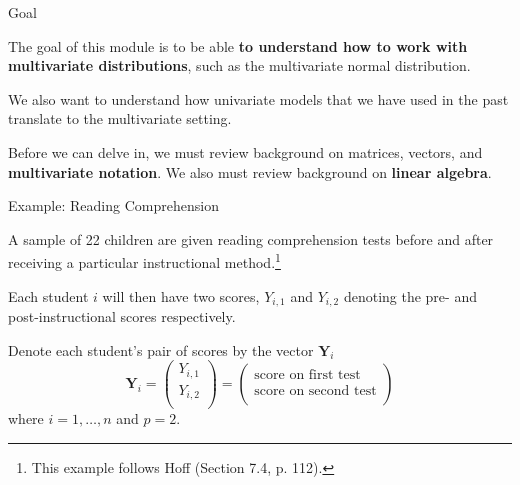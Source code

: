 \documentclass[
  ignorenonframetext,
]{beamer}
\begin{document}
\begin{frame}{Goal}
\protect\hypertarget{goal}{}

The goal of this module is to be able \textbf{to understand how to work
with multivariate distributions}, such as the multivariate normal
distribution.

We also want to understand how univariate models that we have used in
the past translate to the multivariate setting.

Before we can delve in, we must review background on matrices, vectors,
and \textbf{multivariate notation}. We also must review background on
\textbf{linear algebra}.

\end{frame}

\begin{frame}{Example: Reading Comprehension}
\protect\hypertarget{example-reading-comprehension}{}

A sample of 22 children are given reading comprehension tests before and
after receiving a particular instructional
method.\footnote{This example follows Hoff (Section 7.4, p. 112).}

Each student \(i\) will then have two scores, \(Y_{i,1}\) and
\(Y_{i,2}\) denoting the pre- and post-instructional scores
respectively.

Denote each student's pair of scores by the vector \(\bm{Y}_i\) \[
\bm{Y}_{i} = \left( \begin{array}{c}
Y_{i,1}\\
Y_{i,2}\\
\end{array} \right) 
= \left( \begin{array}{c}
\text{score on first test}\\
\text{score on second test}\\
\end{array} \right)
\] where \(i=1,\ldots,n\) and \(p=2.\)

\end{frame}
\end{document}
